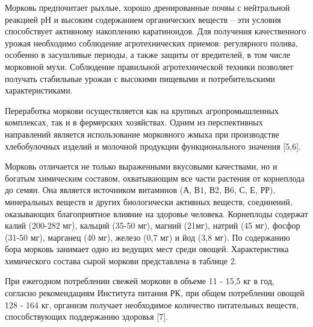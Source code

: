 \begin{multicols}{2}
Морковь предпочитает рыхлые, хорошо дренированные почвы с нейтральной
реакцией рН и высоким содержанием органических веществ -- эти условия
способствует активному накоплению каратиноидов. Для получения
качественного урожая необходимо соблюдение агротехнических приемов:
регулярного полива, особенно в засушливые периоды, а также защиты от
вредителей, в том числе морковной мухи. Соблюдение правильной
агротехнической техники позволяет получать стабильные урожаи с высокими
пищевыми и потребительскими характеристиками.

Переработка моркови осуществляется как на крупных агропромышленных
комплексах, так и в фермерских хозяйствах. Одним из перспективных
направлений является использование морковного жмыха при производстве
хлебобулочных изделий и молочной продукции функционального значения
{[}5,6{]}.

Морковь отличается не только выраженными вкусовыми качествами, но и
богатым химическим составом, охватывающим все части растения от
корнеплода до семян. Она является источником витаминов (А, В1, В2, В6,
С, Е, РР), минеральных веществ и других биологически активных веществ,
соединений, оказывающих благоприятное влияние на здоровье человека.
Корнеплоды содержат калий (200-282 мг), кальций (35-50 мг), магний
(21мг), натрий (45 мг), фосфор (31-50 мг), марганец (40 мг), железо (0,7
мг) и йод (3,8 мг). По содержанию бора морковь занимает одно из ведущих
мест среди овощей. Характеристика химического состава сырой моркови
представлена в таблице 2.

При ежегодном потреблении свежей моркови в объеме 11 - 15,5 кг в год,
согласно рекомендациям Института питания РК, при общем потреблении
овощей 128 - 164 кг, организм получает необходимое количество
питательных веществ, способствующих поддержанию здоровья {[}7{]}.
\end{multicols}

